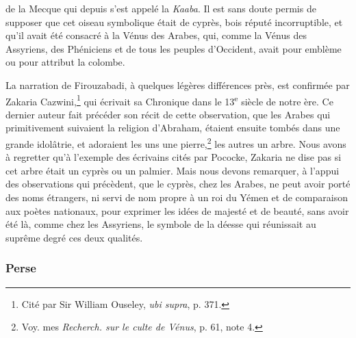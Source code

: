 \documentclass{article}
\begin{document}
de la Mecque qui depuis s'est appelé la \emph{Kaaba}. Il est sans doute permis de supposer que cet oiseau symbolique était de cyprès, bois réputé incorruptible, et qu'il avait été consacré à la Vénus des Arabes, qui, comme la Vénus des Assyriens, des Phéniciens et de tous les peuples d'Occident, avait pour emblème ou pour attribut la colombe.

La narration de Firouzabadi, à quelques légères différences près, est confirmée par Zakaria Cazwini,\footnote{Cité par Sir William Ouseley, \emph{ubi supra}, p. 371.} qui écrivait sa Chronique dans le 13\textsuperscript{e} siècle de notre ère. Ce dernier auteur fait précéder son récit de cette observation, que les Arabes qui primitivement suivaient la religion d'Abraham, étaient ensuite tombés dans une grande idolâtrie, et adoraient les uns une pierre,\footnote{Voy. mes \emph{Recherch. sur le culte de Vénus}, p. 61, note 4.} les autres un arbre. Nous avons à regretter qu'à l'exemple des écrivains cités par Pococke, Zakaria ne dise pas si cet arbre était un cyprès ou un palmier. Mais nous devons remarquer, à l'appui des observations qui précèdent, que le cyprès, chez les Arabes, ne peut avoir porté des noms étrangers, ni servi de nom propre à un roi du Yémen et de comparaison aux poètes nationaux, pour exprimer les idées de majesté et de beauté, sans avoir été là, comme chez les Assyriens, le symbole de la déesse qui réunissait au suprême degré ces deux qualités.

\subsubsection{Perse}
\end{document}
